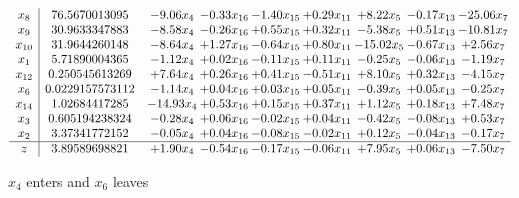 \documentclass[9pt]{article}
\begin{document}
 \[\begin{array}{c| c c@{\hskip 2pt} c@{\hskip 2pt} c@{\hskip 2pt} c@{\hskip 2pt} c@{\hskip 2pt} c@{\hskip 2pt} c@{\hskip 2pt} }
 x_{8}   &  76.5670013095 & -9.06 x_{4} & -0.33 x_{16} & -1.40 x_{15} & +  0.29 x_{11} & +  8.22 x_{5} & -0.17 x_{13} & -25.06 x_{7}\\
 x_{9}   &  30.9633347883 & -8.58 x_{4} & -0.26 x_{16} & +  0.55 x_{15} & +  0.32 x_{11} & -5.38 x_{5} & +  0.51 x_{13} & -10.81 x_{7}\\
 x_{10}   &  31.9644260148 & -8.64 x_{4} & +  1.27 x_{16} & -0.64 x_{15} & +  0.80 x_{11} & -15.02 x_{5} & -0.67 x_{13} & +  2.56 x_{7}\\
 x_{1}   &  5.71890004365 & -1.12 x_{4} & +  0.02 x_{16} & -0.11 x_{15} & +  0.11 x_{11} & -0.25 x_{5} & -0.06 x_{13} & -1.19 x_{7}\\
 x_{12}   &  0.250545613269 & +  7.64 x_{4} & +  0.26 x_{16} & +  0.41 x_{15} & -0.51 x_{11} & +  8.10 x_{5} & +  0.32 x_{13} & -4.15 x_{7}\\
 x_{6}   &  0.0229157573112 & -1.14 x_{4} & +  0.04 x_{16} & +  0.03 x_{15} & +  0.05 x_{11} & -0.39 x_{5} & +  0.05 x_{13} & -0.25 x_{7}\\
 x_{14}   &  1.02684417285 & -14.93 x_{4} & +  0.53 x_{16} & +  0.15 x_{15} & +  0.37 x_{11} & +  1.12 x_{5} & +  0.18 x_{13} & +  7.48 x_{7}\\
 x_{3}   &  0.605194238324 & -0.28 x_{4} & +  0.06 x_{16} & -0.02 x_{15} & +  0.04 x_{11} & -0.42 x_{5} & -0.08 x_{13} & +  0.53 x_{7}\\
 x_{2}   &  3.37341772152 & -0.05 x_{4} & +  0.04 x_{16} & -0.08 x_{15} & -0.02 x_{11} & +  0.12 x_{5} & -0.04 x_{13} & -0.17 x_{7}\\
\hline
z    &  3.89589698821 & +  1.90 x_{4} & -0.54 x_{16} & -0.17 x_{15} & -0.06 x_{11} & +  7.95 x_{5} & +  0.06 x_{13} & -7.50 x_{7}\\
\end{array}\]


 $ x_{4} $ enters and $ x_{6} $ leaves 
\end{document}
